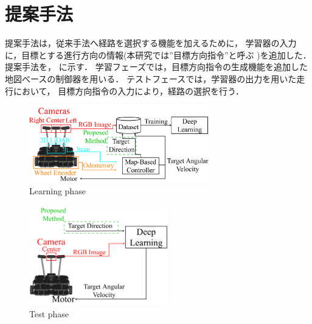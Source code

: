 \documentclass[10pt]{jarticle}
\begin{document}
    \section{提案手法}%
    提案手法は，従来手法へ経路を選択する機能を加えるために，
    学習器の入力に，目標とする進行方向の情報(本研究では”目標方向指令”と呼ぶ )を追加した．
    提案手法を， に示す．
    学習フェーズでは，目標方向指令の生成機能を追加した
    地図べースの制御器を用いる．
    テストフェースでは，学習器の出力を用いた走行において，
    目標方向指令の入力により，経路の選択を行う．
    \begin{center}
        \begin{figure}[htb]
            \centering
            \includegraphics[width=8cm]{./fig/system_learning.pdf}
            \caption{Learning phase}
            \label{fig:system_learning}
        \end{figure}
    \end{center}
    \begin{center}
        \begin{figure}[htb]
            \centering
            \includegraphics[width=6cm]{./fig/system_test.pdf}
            \caption{Test phase}
            \label{fig:system_test}
        \end{figure}
    \end{center}
    \vspace{-1zh}
\end{document}
